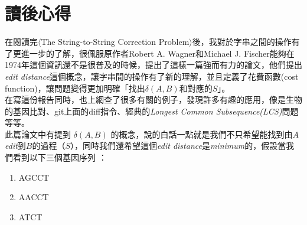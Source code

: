 \documentclass[15pt]{extarticle}
\begin{document}


\section{讀後心得}

在閱讀完$\langle$The String-to-String Correction Problem$\rangle$後，我對於字串之間的操作有了更進一步的了解，很佩服原作者Robert A. Wagner和Michael J. Fischer能夠在1974年這個資訊還不是很普及的時候，提出了這樣一篇強而有力的論文，他們提出\textit{edit distance}這個概念，讓字串間的操作有了新的理解，並且定義了花費函數(cost function)，讓問題變得更加明確「找出$\delta(A,B)$和對應的$S$」。\\

在寫這份報告同時，也上網查了很多有關的例子，發現許多有趣的應用，像是生物的基因比對、git上面的diff指令、經典的\textit{Longest Common Subsequence(LCS)}問題等等。\\

此篇論文中有提到 $\delta(A,B)$ 的概念，說的白話一點就是我們不只希望能找到由$A$ \textit{edit}到$B$的過程（$S$），同時我們還希望這個\textit{edit distance}是\textit{minimum}的，假設當我們看到以下三個基因序列 ：

\begin{enumerate}
    \item AGCCT
    \item AACCT
    \item ATCT
\end{enumerate}
\end{document}

